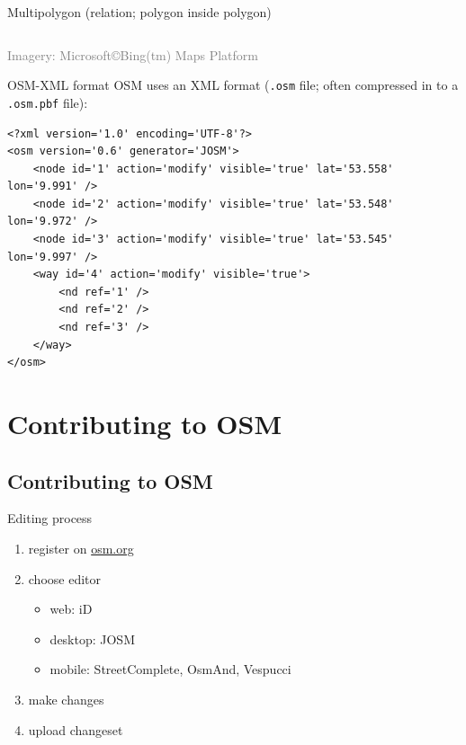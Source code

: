 \documentclass{beamer}
\begin{document}
\begin{frame}{Multipolygon (relation; polygon inside polygon)}
\begin{center}
\begin{columns}
\begin{column}{4cm}
						\end{column}
					\end{columns}
					\vspace{0.25cm}
					\textcolor{gray}{\tiny Imagery: Microsoft\copyright Bing(tm) Maps Platform}
				\end{center}
			\end{frame}
			
			\begin{frame}[fragile]{OSM-XML format}
				OSM uses an XML format (\texttt{.osm} file; often compressed in to a \texttt{.osm.pbf} file):
				\vspace{0.25cm}
				{
					\scriptsize
					\begin{Verbatim}
<?xml version='1.0' encoding='UTF-8'?>
<osm version='0.6' generator='JOSM'>
    <node id='1' action='modify' visible='true' lat='53.558' lon='9.991' />
    <node id='2' action='modify' visible='true' lat='53.548' lon='9.972' />
    <node id='3' action='modify' visible='true' lat='53.545' lon='9.997' />
    <way id='4' action='modify' visible='true'>
        <nd ref='1' />
        <nd ref='2' />
        <nd ref='3' />
    </way>
</osm>
					\end{Verbatim}
				}
			\end{frame}

	\section{Contributing to OSM}
	
		\begin{frame}
			\tableofcontents[currentsection]
		\end{frame}
		
		\subsection{Contributing to OSM}
		
			\begin{frame}{Editing process}
				\begin{enumerate}
					\item register on \href{https://www.openstreetmap.org/user/new}{osm.org}\pause
					\item choose editor
					\begin{itemize}
						\item web: iD
						\item desktop: JOSM
						\item mobile: StreetComplete, OsmAnd, Vespucci
					\end{itemize}\pause
					\item make changes\pause
					\item upload changeset
				\end{enumerate}
			\end{frame}
			
\end{document}
